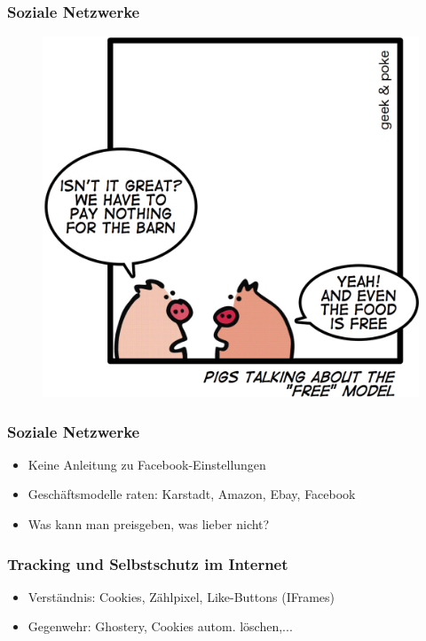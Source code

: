 \documentclass[12pt]{beamer}
\begin{document}
\begin{frame}
  \frametitle{Soziale Netzwerke}
  \begin{figure}
    \includegraphics[height=0.7\textheight]{img/business_pigs.jpg}
  \end{figure}
\end{frame}

\begin{frame}
  \frametitle{Soziale Netzwerke}
  \begin{itemize}
    \item Keine Anleitung zu Facebook-Einstellungen
    \item Geschäftsmodelle raten: Karstadt, Amazon, Ebay, Facebook
    \item Was kann man preisgeben, was lieber nicht?
  \end{itemize}
\end{frame}

\begin{frame}
  \frametitle{Tracking und Selbstschutz im Internet}
  \begin{itemize}
    \item Verständnis: Cookies, Zählpixel, Like-Buttons (IFrames)
    \item Gegenwehr: Ghostery, Cookies autom. löschen,...
  \end{itemize}
\end{frame}
\end{document}
